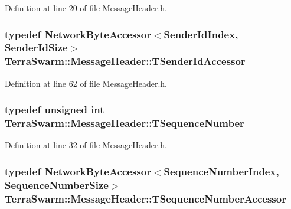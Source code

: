 Definition at line 20 of file Message\-Header.\-h.

\hypertarget{class_terra_swarm_1_1_message_header_aa4003ec191b4bf2a4e38cc289bb10e70}{
\subsubsection[{T\-Sender\-Id\-Accessor}]{\setlength{\rightskip}{0pt plus 5cm}typedef {\bf Network\-Byte\-Accessor}$<${\bf Sender\-Id\-Index}, {\bf Sender\-Id\-Size}$>$ {\bf Terra\-Swarm\-::\-Message\-Header\-::\-T\-Sender\-Id\-Accessor}\hspace{0.3cm}{\ttfamily [private]}}}\label{class_terra_swarm_1_1_message_header_aa4003ec191b4bf2a4e38cc289bb10e70}


Definition at line 62 of file Message\-Header.\-h.

\hypertarget{class_terra_swarm_1_1_message_header_a0d92af0bc15cc856a21975d1f3813eb5}{
\subsubsection[{T\-Sequence\-Number}]{\setlength{\rightskip}{0pt plus 5cm}typedef unsigned int {\bf Terra\-Swarm\-::\-Message\-Header\-::\-T\-Sequence\-Number}\hspace{0.3cm}{\ttfamily [private]}}}\label{class_terra_swarm_1_1_message_header_a0d92af0bc15cc856a21975d1f3813eb5}


Definition at line 32 of file Message\-Header.\-h.

\hypertarget{class_terra_swarm_1_1_message_header_afd4ad43e1cb866a290b7d124af9661f6}{
\subsubsection[{T\-Sequence\-Number\-Accessor}]{\setlength{\rightskip}{0pt plus 5cm}typedef {\bf Network\-Byte\-Accessor}$<${\bf Sequence\-Number\-Index}, {\bf Sequence\-Number\-Size}$>$ {\bf Terra\-Swarm\-::\-Message\-Header\-::\-T\-Sequence\-Number\-Accessor}\hspace{0.3cm}{\ttfamily [private]}}}\label{class_terra_swarm_1_1_message_header_afd4ad43e1cb866a290b7d124af9661f6}


